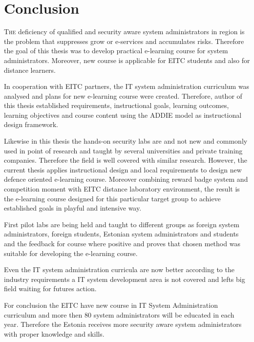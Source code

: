 \chapter{Conclusion}
\label{conclusion}
\lettrine[lraise=0.1, nindent=0em, slope=-.5em]{\color{Violet}T}{he} deficiency of qualified and security aware system administrators in region is the problem that suppresses grow or e-services and accumulates risks. Therefore the goal of this thesis was to develop practical e-learning course for system administrators. Moreover, new course is applicable for \gls{EITC} students and also for distance learners. 

In cooperation with \gls{EITC} partners, the IT system administration curriculum was analysed and plans for new e-learning course were created. Therefore, author of this thesis established requirements, instructional goals, learning outcomes, learning objectives and course content using the \gls{ADDIE} model as instructional design framework. 

Likewise in this thesis the hands-on security labs are and not new and commonly used in point of research and taught by several universities and private training companies. Therefore the field is well covered with similar research. However, the current thesis applies instructional design and local requirements to design new defence oriented e-learning course. Moreover combining reward badge system and competition moment with \gls{EITC} distance laboratory environment, the result is the e-learning course designed for this particular target group to achieve established goals in playful and intensive way.

First pilot labs are being held and taught to different groups as foreign system administrators, foreign students, Estonian system administrators and students and the feedback for course where positive and proves that chosen method was suitable for developing the e-learning course.


Even the IT system administration curricula are now better according to the industry requirements a IT system development area is not covered and lefts big field waiting for futures action.

For conclusion the \gls{EITC} have new course in IT System Administration curriculum and more then 80 system administrators will be educated in each year. Therefore the Estonia receives more security aware system administrators with proper knowledge and skills.
